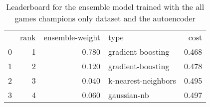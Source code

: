 \begin{table}[]
	\centering
	\begin{tabular}{lrrlr}
		  & rank & ensemble-weight & type                & cost  \\
		0 & 1    & 0.780           & gradient-boosting   & 0.468 \\
		1 & 2    & 0.120           & gradient-boosting   & 0.478 \\
		2 & 3    & 0.040           & k-nearest-neighbors & 0.495 \\
		3 & 4    & 0.060           & gaussian-nb         & 0.497 \\
	\end{tabular}

	\caption{Leaderboard for the ensemble model trained with the all games champions only dataset and the autoencoder}
	\label{tab:lb-all-games-champs-only-autoencode}
\end{table}

